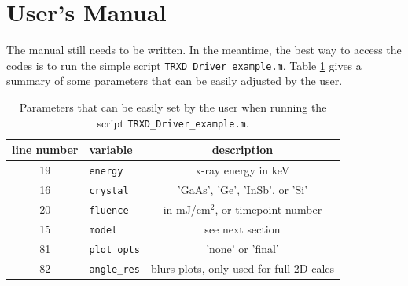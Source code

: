 \documentclass[letterpaper,11pt]{article}
\begin{document}
\section{User's Manual}
The manual still needs to be written.  In the meantime, the best way to access the codes is to run the simple script \texttt{TRXD\_Driver\_example.m}.  Table \ref{table:codeparams} gives a summary of some parameters that can be easily adjusted by the user.

\begin{table}
\begin{centering}
\begin{tabular}{c | l | c}
line number  & variable & description \\
\hline
19 & \texttt{energy} & x-ray energy in keV \\
16 & \texttt{crystal} & 'GaAs', 'Ge', 'InSb', or 'Si' \\
20 & \texttt{fluence} & in mJ/cm$^2$, or timepoint number \\
15 & \texttt{model} & see next section \\
81 & \texttt{plot\_opts} & 'none' or 'final' \\
82 & \texttt{angle\_res} & blurs plots, only used for full 2D calcs \\
\end{tabular} 
\caption{Parameters that can be easily set by the user when running the script \texttt{TRXD\_Driver\_example.m}.}
\label{table:codeparams}
\end{centering}
\end{table}
\end{document}
